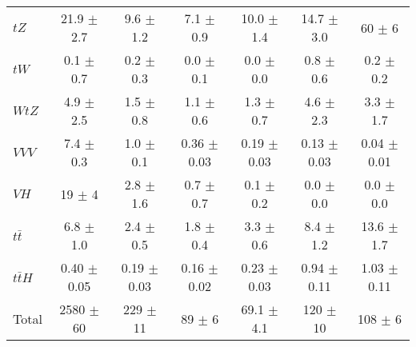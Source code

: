 \begin{tabular}{|l|c|c|c|c|c|c|}
  $tZ$   & 21.9 $\pm$ 2.7 & 9.6 $\pm$ 1.2 & 7.1 $\pm$ 0.9 & 10.0 $\pm$ 1.4 & 14.7 $\pm$ 3.0 & 60 $\pm$ 6 \\ 
  $tW$   & 0.1 $\pm$ 0.7 & 0.2 $\pm$ 0.3 & 0.0 $\pm$ 0.1 & 0.0 $\pm$ 0.0 & 0.8 $\pm$ 0.6 & 0.2 $\pm$ 0.2 \\ 
  $WtZ$   & 4.9 $\pm$ 2.5 & 1.5 $\pm$ 0.8 & 1.1 $\pm$ 0.6 & 1.3 $\pm$ 0.7 & 4.6 $\pm$ 2.3 & 3.3 $\pm$ 1.7 \\ 
  $VVV$   & 7.4 $\pm$ 0.3 & 1.0 $\pm$ 0.1 & 0.36 $\pm$ 0.03 & 0.19 $\pm$ 0.03 & 0.13 $\pm$ 0.03 & 0.04 $\pm$ 0.01 \\ 
  $VH$   & 19 $\pm$ 4 & 2.8 $\pm$ 1.6 & 0.7 $\pm$ 0.7 & 0.1 $\pm$ 0.2 & 0.0 $\pm$ 0.0 & 0.0 $\pm$ 0.0 \\ 
  $t\bar{t}$   & 6.8 $\pm$ 1.0 & 2.4 $\pm$ 0.5 & 1.8 $\pm$ 0.4 & 3.3 $\pm$ 0.6 & 8.4 $\pm$ 1.2 & 13.6 $\pm$ 1.7 \\ 
  $t\bar{t}H$   & 0.40 $\pm$ 0.05 & 0.19 $\pm$ 0.03 & 0.16 $\pm$ 0.02 & 0.23 $\pm$ 0.03 & 0.94 $\pm$ 0.11 & 1.03 $\pm$ 0.11 \\ 
\hline 
  Total  & 2580 $\pm$ 60 & 229 $\pm$ 11 & 89 $\pm$ 6 & 69.1 $\pm$ 4.1 & 120 $\pm$ 10 & 108 $\pm$ 6 \\ 
\hline 
\end{tabular} 

